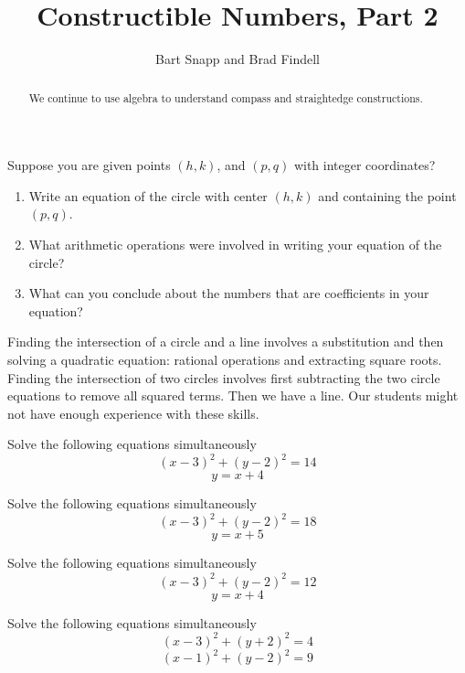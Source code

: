 \documentclass[nooutcomes,handout]{ximera}
\title{Constructible Numbers, Part 2}
\author{Bart Snapp and Brad Findell}
\begin{document}
\begin{abstract}
  We continue to use algebra to understand compass and straightedge
  constructions.
\end{abstract}
\maketitle

\begin{problem}
Suppose you are given points $(h, k)$, and $(p, q)$ with integer coordinates?  
\begin{enumerate}
\item Write an equation of the circle with center $(h, k)$ and containing the point $(p, q)$.  
\item What arithmetic operations were involved in writing your equation of the circle?  
\item What can you conclude about the numbers that are coefficients in your equation?   
\end{enumerate}
\vfill
\end{problem}

\begin{teachingnote}
Finding the intersection of a circle and a line involves a substitution and then solving a quadratic equation:  rational operations and extracting square roots.  Finding the intersection of two circles involves first subtracting the two circle equations to remove all squared terms.  Then we have a line.  Our students might not have enough experience with these skills.  
\end{teachingnote}

\begin{problem}
Solve the following equations simultaneously
$$(x-3)^2+(y-2)^2 = 14$$
$$ y = x + 4$$
\vfill
\end{problem}

\newpage

\begin{problem}
Solve the following equations simultaneously
$$(x-3)^2+(y-2)^2 = 18$$
$$ y = x + 5$$
\vfill
\end{problem}

\begin{problem}
Solve the following equations simultaneously
$$(x-3)^2+(y-2)^2 = 12$$
$$ y = x + 4$$
\vfill
\end{problem}

\newpage

\begin{problem}
Solve the following equations simultaneously
$$(x-3)^2+(y+2)^2 = 4$$
$$(x-1)^2+(y-2)^2 = 9$$
\vfill
\end{problem}
\end{document}
